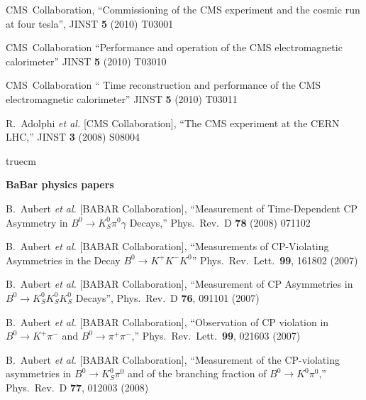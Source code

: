   CMS~Collaboration,
  ``Commissioning of the CMS experiment and the cosmic run at four tesla'',
  JINST {\bf 5} (2010) T03001

 CMS~Collaboration
 ``Performance and operation of the CMS electromagnetic calorimeter''
 JINST {\bf 5} (2010) T03010

 CMS~Collaboration
 `` Time reconstruction and performance of the CMS electromagnetic calorimeter''
 JINST {\bf 5} (2010) T03011

  R.~Adolphi {\it et al.}  [CMS Collaboration],
  ``The CMS experiment at the CERN LHC,''
  JINST {\bf 3} (2008) S08004





 truecm

{\bf BaBar physics papers}

  B.~Aubert {\it et al.}  [BABAR Collaboration],
  ``Measurement of Time-Dependent CP Asymmetry in $B^0 \to K^0_{S} \pi^0
  \gamma$ Decays,''
  Phys.\ Rev.\  D {\bf 78} (2008) 071102


  B.~Aubert {\it et al.}  [BABAR Collaboration],
  ``Measurements of CP-Violating Asymmetries in the Decay $B^0 \to K^+K^-K^0$''
  Phys.\ Rev.\ Lett.\  {\bf 99}, 161802 (2007)

  B.~Aubert {\it et al.}  [BABAR Collaboration],
  ``Measurement of CP Asymmetries in $B^0 \to K^0_S K^0_S K^0_S$ Decays'',
  Phys.\ Rev.\  D {\bf 76}, 091101 (2007)

  B.~Aubert {\it et al.}  [BABAR Collaboration],
  ``Observation of CP violation in $B^0 \to K^{+} \pi^{-}$ and $B^0 \to \pi^{+} \pi^{-}$,''
  Phys.\ Rev.\ Lett.\  {\bf 99}, 021603 (2007)

  B.~Aubert {\it et al.}  [BABAR Collaboration],
  ``Measurement of the CP-violating asymmetries in $B^0 \to K^0_{S} \pi^0$ and of the branching fraction of $B^0 \to K^0 \pi^0$,''
  Phys.\ Rev.\  D {\bf 77}, 012003 (2008)


